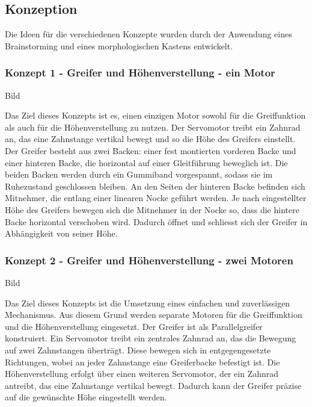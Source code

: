 \documentclass[main.tex]{subfiles} %
\begin{document}
\newpage

\subsection*{Konzeption}

Die Ideen für die verschiedenen Konzepte wurden durch der Anwendung eines Brainstorming und eines morphologischen Kastens entwickelt.

\subsubsection*{Konzept 1 - Greifer und Höhenverstellung - ein Motor}

Bild \newline

Das Ziel dieses Konzepts ist es, einen einzigen Motor sowohl für die Greiffunktion als auch für die Höhenverstellung zu nutzen. 
Der Servomotor treibt ein Zahnrad an, das eine Zahnstange vertikal bewegt und so die Höhe des Greifers einstellt.
Der Greifer besteht aus zwei Backen: einer fest montierten vorderen Backe und einer hinteren Backe, die horizontal auf einer 
Gleitführung beweglich ist. Die beiden Backen werden durch ein Gummiband vorgespannt, sodass sie im Ruhezustand geschlossen bleiben.
An den Seiten der hinteren Backe befinden sich Mitnehmer, die entlang einer linearen Nocke geführt werden. Je nach eingestellter 
Höhe des Greifers bewegen sich die Mitnehmer in der Nocke so, dass die hintere Backe horizontal verschoben wird. Dadurch öffnet 
und schliesst sich der Greifer in Abhängigkeit von seiner Höhe.

\subsubsection*{Konzept 2 - Greifer und Höhenverstellung - zwei Motoren}

Bild \newline

Das Ziel dieses Konzepts ist die Umsetzung eines einfachen und zuverlässigen Mechanismus. Aus diesem Grund werden separate Motoren 
für die Greiffunktion und die Höhenverstellung eingesetzt.
Der Greifer ist als Parallelgreifer konstruiert. Ein Servomotor treibt ein zentrales Zahnrad an, das die Bewegung auf 
zwei Zahnstangen überträgt. Diese bewegen sich in entgegengesetzte Richtungen, wobei an jeder Zahnstange eine Greiferbacke befestigt ist.
Die Höhenverstellung erfolgt über einen weiteren Servomotor, der ein Zahnrad antreibt, das eine Zahnstange vertikal bewegt. 
Dadurch kann der Greifer präzise auf die gewünschte Höhe eingestellt werden.
\end{document}
